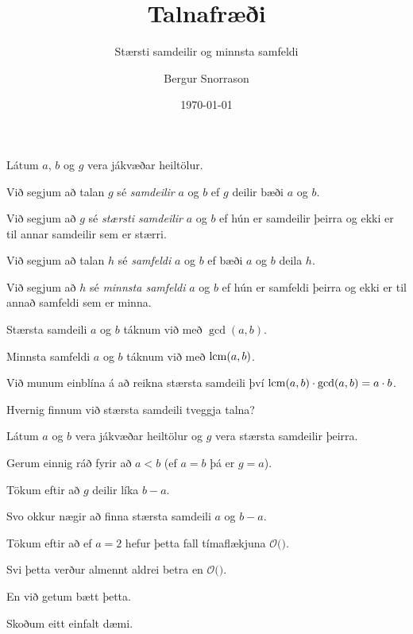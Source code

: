 \title{Talnafræði}
\subtitle{Stærsti samdeilir og minnsta samfeldi}
\author{Bergur Snorrason}
\date{\today}



\frame{\titlepage}

{
	{
		\item<1-> Látum $a$, $b$ og $g$ vera jákvæðar heiltölur.
		\item<2-> Við segjum að talan $g$ sé \emph{samdeilir} $a$ og $b$ ef $g$ deilir bæði $a$ og $b$.
		\item<3-> Við segjum að $g$ sé \emph{stærsti samdeilir} $a$ og $b$ ef hún er samdeilir þeirra og ekki er til annar samdeilir sem er stærri.
		\item<4-> Við segjum að talan $h$ sé \emph{samfeldi} $a$ og $b$ ef bæði $a$ og $b$ deila $h$.
		\item<5-> Við segjum að $h$ sé \emph{minnsta samfeldi} $a$ og $b$ ef hún er samfeldi þeirra og ekki er til annað samfeldi sem er minna.
		\item<6-> Stærsta samdeili $a$ og $b$ táknum við með $\gcd(a, b)$.
		\item<6-> Minnsta samfeldi $a$ og $b$ táknum við með $\operatorname{lcm}(a, b)$.
		\item<7-> Við munum einblína á að reikna stærsta samdeili því $\operatorname{lcm}(a, b) \cdot \gcd(a, b) = a \cdot b$.
	}
}

{
	{
		\item<1-> Hvernig finnum við stærsta samdeili tveggja talna?
		\item<2-> Látum $a$ og $b$ vera jákvæðar heiltölur og $g$ vera stærsta samdeilir þeirra.
		\item<3-> Gerum einnig ráð fyrir að $a < b$ (ef $a = b$ þá er $g = a$).
		\item<4-> Tökum eftir að $g$ deilir líka $b - a$.
		\item<5-> Svo okkur nægir að finna stærsta samdeili $a$ og $b - a$.
		\item<6->[] 
	}
}

{
	{
		\item<1-> Tökum eftir að ef $a = 2$ hefur þetta fall tímaflækjuna $\mathcal{O}($\onslide<2->{$\,b\,$}$)$.
		\item<3-> Svi þetta verður almennt aldrei betra en $\mathcal{O}($\onslide<4->{$\max(a, b)$}$)$.
		\item<5-> En við getum bætt þetta.
		\item<6-> Skoðum eitt einfalt dæmi.
	}
}


